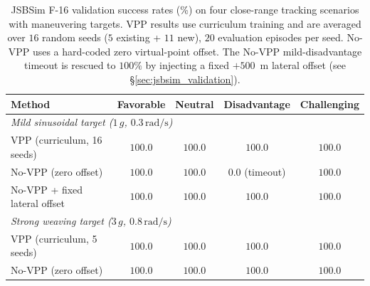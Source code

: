 \begin{table}[t]
\centering
\caption{JSBSim F-16 validation success rates (\%) on four close-range tracking scenarios with maneuvering targets. VPP results use curriculum training and are averaged over $16$ random seeds ($5$ existing + $11$ new), $20$ evaluation episodes per seed. No-VPP uses a hard-coded zero virtual-point offset. The No-VPP mild-disadvantage timeout is rescued to $100\%$ by injecting a fixed $+500$~m lateral offset (see \S\ref{sec:jsbsim_validation}).}
\label{tab:jsbsim_maneuver}
\begin{tabular}{lcccc}
\toprule
Method & Favorable & Neutral & Disadvantage & Challenging \\
\midrule
\multicolumn{5}{l}{\textit{Mild sinusoidal target ($1\,g$, $0.3\,\mathrm{rad/s}$)}} \\
VPP (curriculum, 16 seeds) & $100.0$ & $100.0$ & $\mathbf{100.0}$ & $100.0$ \\
No-VPP (zero offset)       & $100.0$ & $100.0$ & $0.0$ (timeout)  & $100.0$ \\
No-VPP + fixed lateral offset & $100.0$ & $100.0$ & $100.0$ & $100.0$ \\
\midrule
\multicolumn{5}{l}{\textit{Strong weaving target ($3\,g$, $0.8\,\mathrm{rad/s}$)}} \\
VPP (curriculum, 5 seeds)  & $100.0$ & $100.0$ & $\mathbf{100.0}$ & $100.0$ \\
No-VPP (zero offset)       & $100.0$ & $100.0$ & $100.0$          & $100.0$ \\
\bottomrule
\end{tabular}
\end{table}
